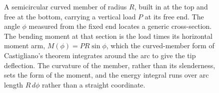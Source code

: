 \begin{figure}[htbp]
\begin{tikzpicture}
\end{tikzpicture}
\caption[Semicircular curved cantilever under a tip load]{A semicircular
curved member of radius $R$, built in at the top and free at the bottom,
carrying a vertical load $P$ at its free end. The angle $\phi$ measured from
the fixed end locates a generic cross-section. The bending moment at that
section is the load times its horizontal moment arm, $M(\phi)=PR\sin\phi$,
which the curved-member form of Castigliano's theorem integrates around the
arc to give the tip deflection. The curvature of the member, rather than its
slenderness, sets the form of the moment, and the energy integral runs over
arc length $R\,d\phi$ rather than a straight coordinate.}
\label{fig:vol03ch05:curved-member}
\end{figure}
